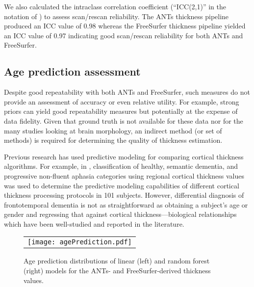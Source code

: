 We also calculated the intraclass correlation coefficient 
(``ICC(2,1)'' in the notation of \cite{shrout1979}) to assess 
scan/rescan reliability. The ANTs thickness pipeline produced an 
ICC value of 0.98 whereas the FreeSurfer thickness pipeline yielded
an ICC value of 0.97 indicating good scan/rescan reliability for
both ANTs and FreeSurfer.

\subsection{Age prediction assessment}

Despite good repeatability with both ANTs and FreeSurfer, such measures
do not provide an assessment of accuracy or even relative utility.  For example, 
strong priors can yield good repeatability measures but potentially at the expense 
of data fidelity.  Given that ground truth is not available for 
these data nor for the many studies looking at brain
morphology, an indirect method (or set of methods) is required for
determining the quality of thickness estimation.

Previous research has used predictive modeling for comparing cortical
thickness algorithms.  For example, in \cite{clarkson2011}, classification
of healthy, semantic dementia, and progressive non-fluent aphasia categories
using regional cortical thickness values was used to determine the predictive
modeling capabilities of different cortical thickness processing protocols in 
101 subjects. However, differential diagnosis of frontotemporal dementia 
\cite{neary2005} is not as straightforward as obtaining a subject's age
or gender and regressing that against cortical thickness---biological 
relationships which have been well-studied and reported in the literature.  

\begin{figure}[htb]
  \centering
  \begin{tabular}{c}
  \texttt{[image: agePrediction.pdf]} \\
  \end{tabular}
  \caption{Age prediction distributions of linear (left) and random forest (right)
           models for the ANTs- and FreeSurfer-derived thickness values.
           }
  \label{fig:agePrediction}
\end{figure}


